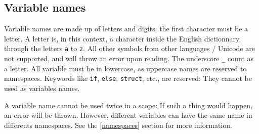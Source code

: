 \subsection{Variable names} \label{varnames}

Variable names are made up of letters and digits; the first character
must be a letter. A letter is, in this context, a character inside
the English dictionnary, through the letters \texttt{a} to \texttt{z}.
All other symbols from other languages / Unicode are not supported,
and will throw an error upon reading. The underscore \texttt{\_}
count as a letter. All variable must be in lowercase, as uppercase
names are reserved to namespaces.
Keywords like \texttt{if}, \texttt{else}, \texttt{struct}, etc., are
reserved: They cannot be used as variables names.

A variable name cannot be used twice in a scope: If such a thing
would happen, an error will be thrown. However, different variables
can have the same name in differents namespaces. See the \ref{namespaces}
section for more information.

